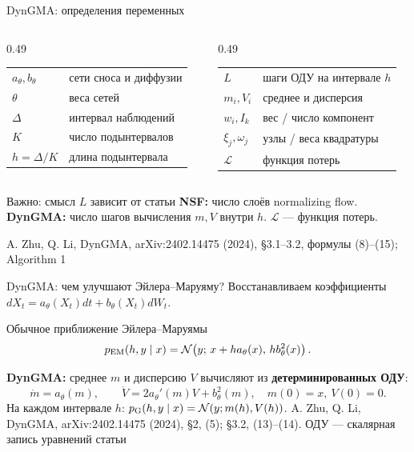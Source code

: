 \documentclass[10pt,aspectratio=169]{beamer}
\newcommand{\dynsrc}[1]{\vfill{\tiny\color{graytext}A. Zhu, Q. Li, DynGMA, arXiv:2402.14475 (2024), #1}}
\begin{document}
\begin{frame}{DynGMA: определения переменных}
\vspace{0.02cm}
{\small
\begin{columns}[T,onlytextwidth]
\begin{column}{0.49\textwidth}
\begin{tabular}{@{}p{2.05cm}p{4.05cm}@{}}
$a_\theta,b_\theta$ & сети сноса и диффузии \\[0.07cm]
$\theta$ & веса сетей \\[0.07cm]
$\Delta$ & интервал наблюдений \\[0.07cm]
$K$ & число подынтервалов \\[0.07cm]
$h=\Delta/K$ & длина подынтервала
\end{tabular}
\end{column}
\begin{column}{0.49\textwidth}
\begin{tabular}{@{}p{2.05cm}p{4.05cm}@{}}
$L$ & шаги ОДУ на интервале $h$ \\[0.07cm]
$m_i,V_i$ & среднее и дисперсия \\[0.07cm]
$w_i,I_k$ & вес / число компонент \\[0.07cm]
$\xi_j,\omega_j$ & узлы / веса квадратуры \\[0.07cm]
$\mathcal L$ & функция потерь
\end{tabular}
\end{column}
\end{columns}}
\vspace{0.13cm}
\begin{block}{Важно: смысл $L$ зависит от статьи}
\textbf{NSF:} число слоёв normalizing flow. \textbf{DynGMA:} число шагов вычисления $m,V$ внутри $h$. \quad $\mathcal L$ --- функция потерь.
\end{block}
\dynsrc{\S 3.1--3.2, формулы (8)--(15); Algorithm 1}
\end{frame}

\begin{frame}{DynGMA: чем улучшают Эйлера--Маруяму?}
\vspace{0.07cm}
Восстанавливаем коэффициенты \,$dX_t=a_\theta(X_t)dt+b_\theta(X_t)dW_t$.
\vspace{0.09cm}
\begin{block}{Обычное приближение Эйлера--Маруямы}
\[
 p_{\rm EM}(h,y\mid x)=\mathcal N\!\left(y;\,x+h a_\theta(x),\,h b_\theta^2(x)\right).
\]
\end{block}
\vspace{0.06cm}
\textbf{DynGMA:} среднее $m$ и дисперсию $V$ вычисляют из \textbf{детерминированных ОДУ}:
\[
\boxed{\quad
\dot m=a_\theta(m),\qquad
\dot V=2a_\theta'(m) V+b_\theta^2(m),\quad m(0)=x,\ V(0)=0.
\quad}
\]
\vspace{-0.04cm}
На каждом интервале $h$: $p_{\rm G}(h,y\mid x)=\mathcal N(y;m(h),V(h))$.
\dynsrc{\S 2, (5); \S 3.2, (13)--(14). ОДУ --- скалярная запись уравнений статьи}
\end{frame}
\end{document}
